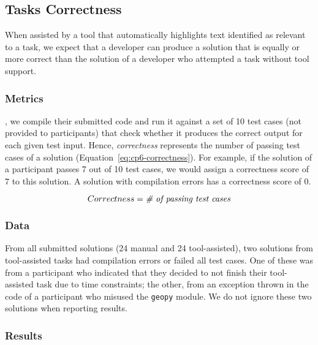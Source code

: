 
\subsection{Tasks Correctness}
\label{cp6:correctness}



When assisted by a tool that automatically highlights text identified as relevant to a task, we expect that a developer can produce a solution 
that is equally or more correct than the solution of a developer who attempted a task without tool support. 


\subsubsection{Metrics}


, 
we compile their submitted code and run it against a set of 10 test cases (not provided to participants) that check whether it produces the correct output for each given test input. 
Hence, \textit{correctness} represents the number of passing test cases of a solution (Equation~\ref{eq:cp6-correctness}).
For example, if the solution of a participant passes 7 out of 10 test cases, we would assign a 
correctness score of $7$ to this solution. 
A solution with compilation errors has a correctness score of $0$.


\begin{small}
\begin{equation}
    Correctness = \text{\textit{\# of passing test cases}}
    \label{eq:cp6-correctness}
\end{equation}
\end{small}



\subsubsection{Data}

From all submitted solutions (24 manual and 24 tool-assisted), two 
solutions from tool-assisted tasks had compilation errors or failed all test cases. 
One of these
was from a participant who indicated that they decided to not finish their tool-assisted task due to time constraints; 
the other, from an exception thrown in the code of a participant who misused the \texttt{geopy} module. We do not ignore these two solutions when reporting results.



\subsubsection{Results}



